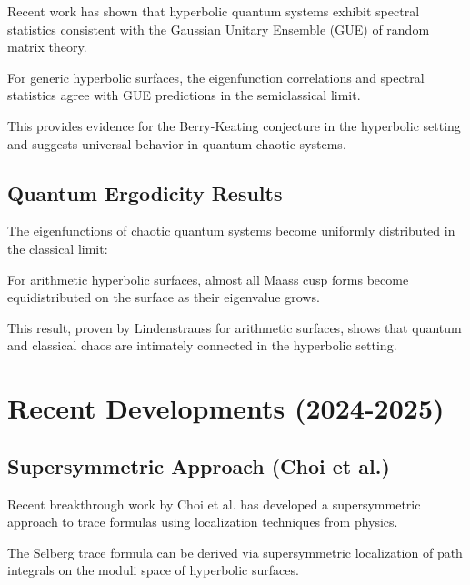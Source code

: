 Recent work has shown that hyperbolic quantum systems exhibit spectral statistics consistent with the Gaussian Unitary Ensemble (GUE) of random matrix theory.

\begin{theorem}
\label{thm:quantum_ergodicity}
For generic hyperbolic surfaces, the eigenfunction correlations and spectral statistics agree with GUE predictions in the semiclassical limit.
\end{theorem}

This provides evidence for the Berry-Keating conjecture in the hyperbolic setting and suggests universal behavior in quantum chaotic systems.

\subsection{Quantum Ergodicity Results}

The eigenfunctions of chaotic quantum systems become uniformly distributed in the classical limit:

\begin{theorem}
\label{thm:quantum_unique_ergodicity}
For arithmetic hyperbolic surfaces, almost all Maass cusp forms become equidistributed on the surface as their eigenvalue grows.
\end{theorem}

This result, proven by Lindenstrauss for arithmetic surfaces, shows that quantum and classical chaos are intimately connected in the hyperbolic setting.

\section{Recent Developments (2024-2025)}
\label{sec:recent_developments}

\subsection{Supersymmetric Approach (Choi et al.)}

Recent breakthrough work by Choi et al. \cite{choi2025} has developed a supersymmetric approach to trace formulas using localization techniques from physics.

\begin{theorem}
\label{thm:supersymmetric_trace}
The Selberg trace formula can be derived via supersymmetric localization of path integrals on the moduli space of hyperbolic surfaces.
\end{theorem}


